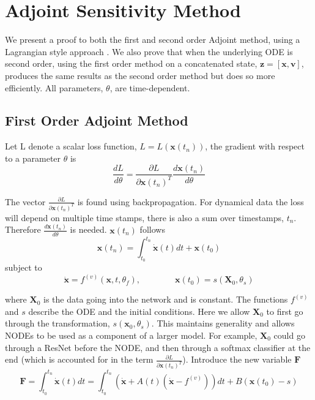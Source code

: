 \documentclass{article}
\theoremstyle{remark}
\theoremstyle{definition}
\begin{document}
\section{Adjoint Sensitivity Method}
\label{app: adjoint_method}

We present a proof to both the first and second order Adjoint method, using a Lagrangian style approach \citep{stanford_adjoint_derivation, Gholaminejad_2019}. We also prove that when the underlying ODE is second order, using the first order method on a concatenated state, $\mathbf{z} = [\mathbf{x}, \mathbf{v}]$, produces the same results as the second order method but does so more efficiently. All parameters, $\theta$, are time-dependent.

\subsection{First Order Adjoint Method}

Let L denote a scalar loss function, $L = L(\mathbf{x}(t_{n}))$, the gradient with respect to a parameter $\theta$ is
\begin{equation}
\label{eqn: dLdtheta}
    \frac{dL}{d\theta} = \frac{\partial L}{\partial \mathbf{x}(t_{n})^{T}}\frac{d\mathbf{x}(t_{n})}{d\theta}
\end{equation}

The vector $\displaystyle  \frac{\partial L}{\partial \mathbf{x}(t_{n})^{T}}$ is found using backpropagation. For dynamical data the loss will depend on multiple time stamps, there is also a sum over timestamps, $t_{n}$. Therefore $\displaystyle  \frac{d\mathbf{x}(t_{n})}{d\theta}$ is needed. $\mathbf{x}(t_{n})$ follows
\begin{equation}
    \mathbf{x}(t_{n}) = \int_{t_{0}}^{t_{n}}\dot{\mathbf{x}}(t)dt + \mathbf{x}(t_{0})
\end{equation}
subject to
\begin{equation}
    \dot{\mathbf{x}} = f^{(v)}(\mathbf{x}, t,\theta_{f}),
    \qquad
    \qquad
    \mathbf{x}(t_{0}) = s(\mathbf{X}_{0}, \theta_{s})
\end{equation}

where $\mathbf{X}_{0}$ is the data going into the network and is constant. The functions $f^{(v)}$ and $s$ describe the ODE and the initial conditions. Here we allow $\mathbf{X}_{0}$ to first go through the transformation, $s(\mathbf{x}_{0}, \theta_{s})$. This maintains generality and allows NODEs to be used as a component of a larger model. For example, $\mathbf{X}_{0}$ could go through a ResNet before the NODE, and then through a softmax classifier at the end (which is accounted for in the term $\displaystyle  \frac{\partial L}{\partial \mathbf{x}(t_{n})^{T}}$). Introduce the new variable $\mathbf{F}$
\begin{equation}
\label{eqn: F_first_order}
    \mathbf{F} = \int_{t_{0}}^{t_{n}}\dot{\mathbf{x}}(t)dt
    = \int_{t_{0}}^{t_{n}}\left(\dot{\mathbf{x}} + A(t)
    (\dot{\mathbf{x}}-f^{(v)})
    \right)dt + 
    B(\mathbf{x}(t_{0}) - s)
\end{equation}
\end{document}
